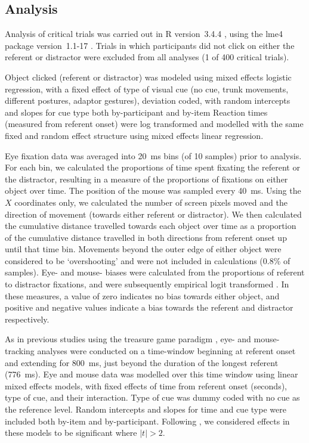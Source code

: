 \documentclass[a4paper,man,natbib]{apa6}
\begin{document}
\subsection{Analysis}
Analysis of critical trials was carried out in R version~3.4.4 \citep{Rbase2017}, using the lme4 package version~1.1-17 \citep{Bates2015}. 
Trials in which participants did not click on either the referent or distractor were excluded from all analyses (1 of 400 critical trials).

Object clicked (referent or distractor) was modeled using mixed effects logistic regression, with a fixed effect of type of visual cue (no cue, trunk movements, different postures, adaptor gestures), deviation coded, with random intercepts and slopes for cue type both by-participant and by-item
Reaction times (measured from referent onset) were log transformed and modelled with the same fixed and random effect structure using mixed effects linear regression.

Eye fixation data was averaged into 20~ms bins (of 10 samples) prior to analysis.
For each bin, we calculated the proportions of time spent fixating the referent or the distractor, resulting in a measure of the proportions of fixations on either object over time.
The position of the mouse was sampled every 40~ms.
Using the $X$ coordinates only, we calculated the number of screen pixels moved and the direction of movement (towards either referent or distractor).
We then calculated the cumulative distance travelled towards each object over time as a proportion of the cumulative distance travelled in both directions from referent onset up until that time bin.
Movements beyond the outer edge of either object were considered to be `overshooting' and were not included in calculations (0.8\% of samples).
Eye- and mouse- biases were calculated from the proportions of referent to distractor fixations, and were subsequently empirical logit transformed \citep{Barr2008}. 
In these measures, a value of zero indicates no bias towards either object, and positive and negative values indicate a bias towards the referent and distractor respectively.

As in previous studies using the treasure game paradigm \citep{King2018,Loy2017}, eye- and mouse- tracking analyses were conducted on a time-window beginning at referent onset and extending for 800~ms, just beyond the duration of the longest referent (776~ms).
Eye and mouse data was modelled over this time window using linear mixed effects models, with fixed effects of time from referent onset (seconds), type of cue, and their interaction.
Type of cue was dummy coded with no cue as the reference level.
Random intercepts and slopes for time and cue type were included both by-item and by-participant.
Following \citet{Baayen2008}, we considered effects in these models to be significant where $|t|>2$.
\end{document}
